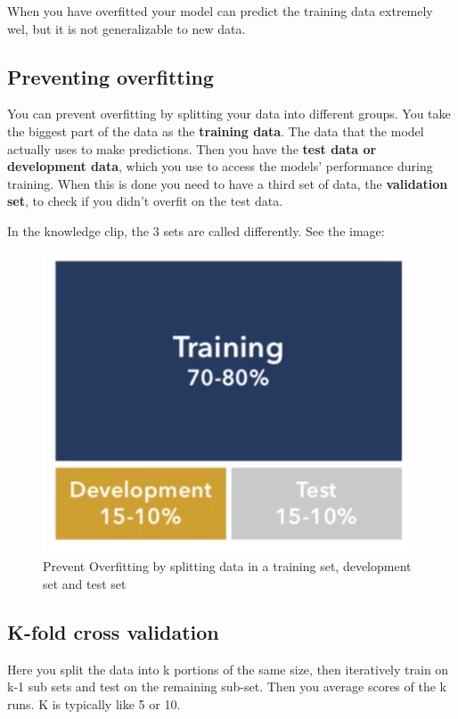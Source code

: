 \documentclass[
  11pt,
  british,
]{article}
\begin{document}
When you have overfitted your model can predict the training data
extremely wel, but it is not generalizable to new data.

\hypertarget{preventing-overfitting}{%
\subsection{Preventing overfitting}\label{preventing-overfitting}}

You can prevent overfitting by splitting your data into different
groups. You take the biggest part of the data as the \textbf{training
data}. The data that the model actually uses to make predictions. Then
you have the \textbf{test data or development data}, which you use to
access the models' performance during training. When this is done you
need to have a third set of data, the \textbf{validation set}, to check
if you didn't overfit on the test data.

In the knowledge clip, the 3 sets are called differently. See the image:

\begin{figure}
\centering
\includegraphics{Pasted_image_20220216120004.png}
\caption{Prevent Overfitting by splitting data in a training set,
development set and test set}
\end{figure}

\hypertarget{k-fold-cross-validation}{%
\subsection{K-fold cross validation}\label{k-fold-cross-validation}}

Here you split the data into k portions of the same size, then
iteratively train on k-1 sub sets and test on the remaining sub-set.
Then you average scores of the k runs. K is typically like 5 or 10.
\end{document}
